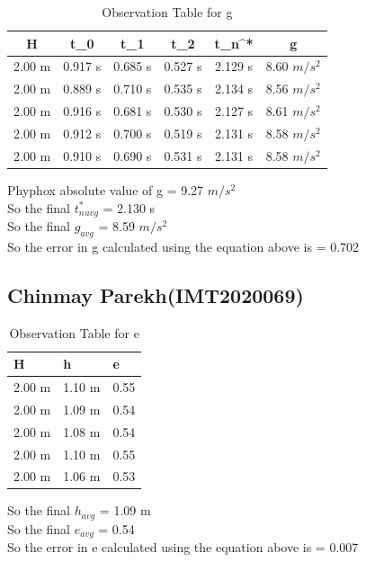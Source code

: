 \documentclass[11pt]{scrartcl} %
\begin{document}
\begin{table}[h]
\centering
\begin{tabular}{||c c c c c c||} 
\toprule
 \hline
 H & t_0 & t_1 & t_2 & t_n^* & g \\ [0.5ex] 
 \midrule
 \hline\hline
 2.00 m & 0.917 s & 0.685 s  & 0.527 s & 2.129 s & 8.60 $m/s^2$  \\ 
 \hline
 2.00 m & 0.889 s & 0.710 s & 0.535 s & 2.134 s & 8.56 $m/s^2$  \\
 \hline
 2.00 m & 0.916 s & 0.681 s & 0.530 s & 2.127 s  & 8.61 $m/s^2$   \\
 \hline
 2.00 m & 0.912 s & 0.700 s & 0.519 s & 2.131 s  & 8.58 $m/s^2$   \\
 \hline
 2.00 m & 0.910 s & 0.690 s & 0.531 s & 2.131 s  & 8.58 $m/s^2$  \\ [1ex] 
 \bottomrule
 \hline
\end{tabular}
\caption{Observation Table for g}
\end{table}
Phyphox absolute value of g = 9.27 $m/s^2$\\
So the final $t_n^*_{avg}$ = 2.130 s\\
So the final $g_{avg}$ = 8.59 $m/s^2$\\
So the error in g calculated using the equation above is  = 0.702

\newpage
\subsection{Chinmay Parekh(IMT2020069)}

\begin{table}[h] %
	\centering %
	\begin{tabular}{l l l}
		\toprule
		\textbf{H} & \textbf{h} & \textbf{e} \\
		\midrule
		2.00 m & 1.10 m & 0.55\\
        2.00 m & 1.09 m  & 0.54\\
        2.00 m & 1.08 m  & 0.54\\
        2.00 m & 1.10 m & 0.55 \\
        2.00 m & 1.06 m & 0.53 \\
		\bottomrule
	\end{tabular}
	\caption{Observation Table for e}
\end{table}
So the final $h_{avg}$ = 1.09 m\\
So the final $e_{avg}$ = 0.54\\
So the error in e calculated using the equation above is  = 0.007
\end{document}
